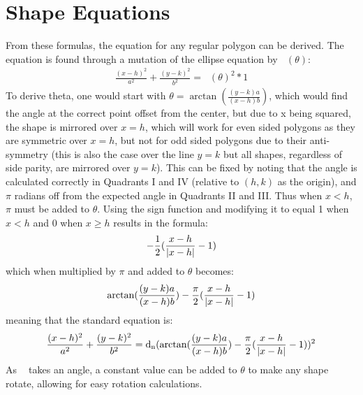 \documentclass[11pt]{article}
\DeclareMathOperator{\custd}{\mathrm{d}_n}
\DeclareMathOperator{\custdsq}{\mathrm{d}_n}
\DeclarePairedDelimiter\abs{\lvert}{\rvert}%
\begin{document}
\section{Shape Equations}
From these formulas, the equation for any regular polygon can be derived. The equation is found through a mutation of the ellipse equation by \(\custd(\theta)\):
\begin{gather*}
\frac{(x-h)^2}{a^2}+\frac{(y-k)^2}{b^2}=\custd(\theta)^2*1
\end{gather*}
To derive theta, one would start with \(\theta=\arctan(\frac{(y-k)a}{(x-h)b})\), which would find the angle at the correct point offset from the center, but due to x being squared, the shape is mirrored over \(x=h\), which will work for even sided polygons as they are symmetric over \(x=h\), but not for odd sided polygons due to their anti-symmetry (this is also the case over the line \(y=k\) but all shapes, regardless of side parity, are mirrored  over \(y=k\)). This can be fixed by noting that the angle is calculated correctly in Quadrants I and IV (relative to \((h,k)\) as the origin), and \(\pi\) radians off from the expected angle in Quadrants II and III. Thus when \(x<h\), \(\pi\) must be added to \(\theta\). Using the sign function and modifying it to equal 1 when \(x<h\) and 0 when \(x\geq h\) results in the formula:
\begin{gather*}
-\frac{1}{2}(\frac{x-h}{\abs{x-h}}-1)
\end{gather*}
which when multiplied by \(\pi\) and added to \(\theta\) becomes:
\begin{gather*}
\arctan(\frac{(y-k)a}{(x-h)b})-\frac{\pi}{2}(\frac{x-h}{\abs{x-h}}-1)
\end{gather*}
meaning that the standard equation is:
\begin{gather*}
\frac{(x-h)^2}{a^2}+\frac{(y-k)^2}{b^2}=\custdsq(\arctan(\frac{(y-k)a}{(x-h)b})-\frac{\pi}{2}(\frac{x-h}{\abs{x-h}}-1))^2
\end{gather*}
As \(\custd\) takes an angle, a constant value can be added to \(\theta\) to make any shape rotate, allowing for easy rotation calculations.
\end{document}
